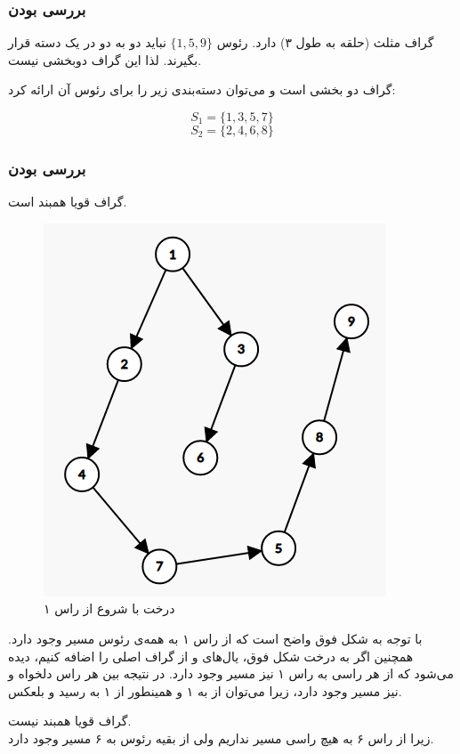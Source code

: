 \documentclass{article}
\begin{document}
\begin{multicols}{2}
\subsubsection*{بررسی  بودن}
گراف
مثلث (حلقه به طول ۳) دارد. رئوس 
$\{1, 5, 9\}$
نباید دو به دو در یک دسته قرار بگیرند. لذا این گراف دوبخشی نیست.

گراف
دو بخشی است  و می‌توان دسته‌بندی زیر را برای رئوس آن ارائه کرد:
\begin{LTR}
$$S_1 = \{ 1, 3, 5, 7 \}$$
$$S_2 = \{ 2, 4, 6, 8 \}$$
\end{LTR}

\subsubsection*{بررسی  بودن}
گراف
قویا همبند است.
\begin{figure}[H]
    \center
    \includegraphics[width=0.8\linewidth]{Photos/HW1/dfs.png}
    \caption{درخت  با شروع از راس ۱}
    \label{fig:my_label}
\end{figure}
با توجه به شکل فوق واضح است که از راس ۱ به همه‌ی رئوس مسیر وجود دارد. همچنین
اگر به درخت شکل فوق، یال‌های
و
از گراف اصلی را اضافه کنیم، دیده می‌شود که از هر راسی به راس ۱ نیز مسیر وجود دارد. در نتیجه بین هر راس دلخواه
و
نیز مسیر وجود دارد، زیرا می‌توان از
به ۱ و همینطور از ۱ به
رسید و بلعکس.

گراف
قویا همبند نیست.\\
زیرا از راس ۶ به هیچ راسی مسیر نداریم ولی از بقیه رئوس به ۶ مسیر وجود دارد.


\end{multicols}
\end{document}
